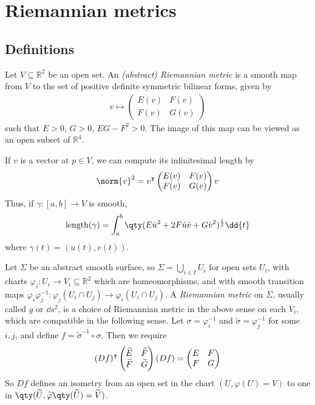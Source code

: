 \section{Riemannian metrics}

\subsection{Definitions}
\begin{definition}
	Let $V \subseteq \mathbb R^2$ be an open set.
	An \textit{(abstract) Riemannian metric} is a smooth map from $V$ to the set of positive definite symmetric bilinear forms, given by
	\begin{align*}
		v \mapsto \begin{pmatrix}
			E(v) & F(v) \\
			F(v) & G(v)
		\end{pmatrix}
	\end{align*}
	such that $E > 0$, $G > 0$, $EG - F^2 > 0$.
	The image of this map can be viewed as an open subset of $\mathbb R^4$.
\end{definition}
If $v$ is a vector at $p \in V$, we can compute its infinitesimal length by
\begin{align*}
	\norm{v}^2 = v^\tran \begin{pmatrix}
		E(v) & F(v) \\
		F(v) & G(v)
	\end{pmatrix} v
\end{align*}
Thus, if $\gamma \colon [a,b] \to V$ is smooth,
\begin{align*}
	\mathrm{length}(\gamma) = \int_a^b \qty( E \dot u^2 + 2F \dot u \dot v + G \dot v^2 )^{\frac{1}{2}} \dd{t}
\end{align*}
where $\gamma(t) = (u(t),v(t))$.
\begin{definition}
	Let $\Sigma$ be an abstract smooth surface, so $\Sigma = \bigcup_{i \in I} U_i$ for open sets $U_i$, with charts $\varphi_i \colon U_i \to V_i \subseteq \mathbb R^2$ which are homeomorphisms, and with smooth transition maps $\varphi_i \varphi_j^{-1} \colon \varphi_j(U_i \cap U_j) \to \varphi_i(U_i \cap U_j)$.
	A \textit{Riemannian metric} on $\Sigma$, usually called $g$ or $\dd{s}^2$, is a choice of Riemannian metric in the above sense on each $V_i$, which are compatible in the following sense.
	Let $\sigma = \varphi_i^{-1}$ and $\widetilde \sigma = \varphi_j^{-1}$ for some $i,j$, and define $f = \widetilde \sigma^{-1} \circ \sigma$.
	Then we require
	\begin{align*}
		(Df)^\intercal \begin{pmatrix}
			\widetilde E & \widetilde F \\
			\widetilde F & \widetilde G
		\end{pmatrix} (Df) = \begin{pmatrix}
			E & F \\
			F & G
		\end{pmatrix}
	\end{align*}
	So $Df$ defines an isometry from an open set in the chart $(U, \varphi(U) = V)$ to one in $\qty(\widetilde U, \widetilde \varphi\qty(\widetilde U) = \widetilde V)$.
\end{definition}
